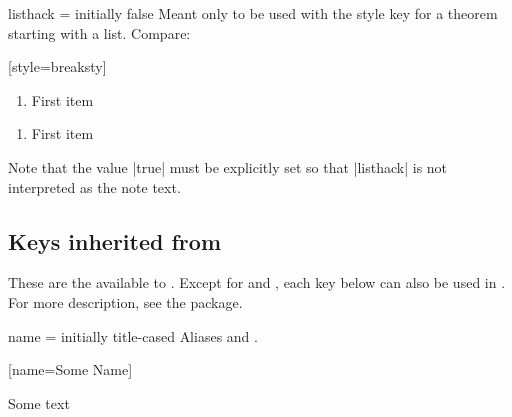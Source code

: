 \documentclass{ltxdoc}
\begin{document}
\begin{docKey}{listhack}
  {=\textbar{}}
  {initially false}
Meant only to be used with the  style key for a theorem starting with a list. Compare:

\begin{tcbwritetemp}
[style=breaksty]
\end{tcbwritetemp}

\begin{keythmscode}[withpreamble]
\begin{observation}
\begin{enumerate}
\item First item
\end{enumerate}
\end{observation}

\begin{observation}[listhack=true]
\begin{enumerate}
\item First item
\end{enumerate}
\end{observation}
\end{keythmscode}

Note that the value |true| must be explicitly set so that |listhack| is not interpreted as the note text.
\end{docKey}

\subsection{Keys inherited from } \label{thm-thmtools-keys}

These are the  available to . Except for  and , each key below can also be used in . For more description, see the \href{https://ctan.org/pkg/thmtools}{} package.

\begin{docKey}[][doc label=thm/name]{name}
  {=}
  {initially title-cased }
Aliases  and .

\begin{tcbwritetemp}
[name=Some Name]
\end{tcbwritetemp}

\begin{keythmscode}[withpreamble]
\begin{mythm}
Some text
\end{mythm}
\end{keythmscode}

\end{docKey}
\end{document}
